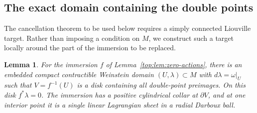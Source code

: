 \documentclass[11pt]{article}
\numberwithin{equation}{section}
\newtheorem{lemma}[theorem]{Lemma}
\theoremstyle{definition}
\theoremstyle{remark}
\begin{document}
\subsection{The exact domain containing the double points}

The cancellation theorem to be used below requires a simply connected
Liouville target.  Rather than imposing a condition on $M$, we construct
such a target locally around the part of the immersion to be replaced.

\begin{lemma}\label{top:lem:exact-domain}
For the immersion $f$ of Lemma~\ref{top:lem:zero-actions}, there is an
embedded compact contractible Weinstein domain $(U,\lambda)\subset M$
with $d\lambda=\omega|_U$ such that $V=f^{-1}(U)$ is a disk containing
all double-point preimages.  On this disk $f^*\lambda=0$.  The
immersion has a positive cylindrical collar at $\partial V$, and
at one interior point it is a single linear Lagrangian sheet in a
radial Darboux ball.
\end{lemma}
\end{document}
